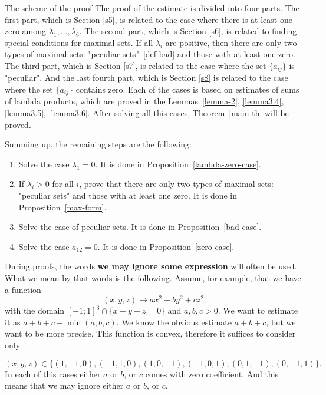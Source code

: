 \documentclass[12pt]{article}
\begin{document}
\begin{section}{The scheme of the proof}
The proof of the estimate is divided into four parts. The first part, which is Section \ref{s5}, is related to the case where there is at least one zero among $\lambda_{1},\ldots,\lambda_{6}.$ The second part, which is Section \ref{s6}, is related to finding special conditions for maximal sets. If all $\lambda_{i}$ are positive, then there are only two types of maximal sets: "peculiar sets"~\ref{def-bad} and those with at least one zero. The third part, which is Section \ref{s7}, is related to the case where the set $\{a_{ij}\}$ is "peculiar". And the last fourth part, which is Section \ref{s8} is related to the case where the set $\{a_{ij}\}$ contains zero. Each of the cases is based on estimates of sums of lambda products, which are proved in the Lemmas~\ref{lemma-2}, \ref{lemma3.4}, \ref{lemma3.5}, \ref{lemma3.6}. After solving all this cases, Theorem~\ref{main-th} will be proved. 

Summing up, the remaining steps are the following:

\begin{enumerate}
    \item Solve the case $\lambda_{1}=0.$ It is done in Proposition~\ref{lambda-zero-case}.
    \item If $\lambda_{i}>0$ for all $i$, prove that there are only two types of maximal sets: "peculiar sets" and those with at least one zero. It is done in Proposition~\ref{max-form}. 
    \item Solve the case of peculiar sets. It is done in Proposition~\ref{bad-case}.
    \item Solve the case  $a_{12}=0$. It is done in Proposition~\ref{zero-case}.
    
\end{enumerate}


    During proofs, the words \textbf{we may ignore some  expression} will often be used. What we mean by that words is the following. Assume, for example, that we have a function $$(x,y,z)\mapsto ax^2 + by^2 + cz^2$$ with the domain $[-1;1]^{3}\cap \{x+y+z=0\}$ and $a,b,c > 0$. We want to estimate it as $a+b+c - \min(a,b,c).$ We know the obvious estimate $a+b+c$, but we want to be more precise. This function is convex, therefore it suffices to consider only 
    
    $$(x,y,z)\in \{(1,-1,0),(-1,1,0),(1,0,-1),(-1,0,1),(0,1,-1), (0,-1,1)\}.$$  
    In each of this cases either $a$ or $b$, or $c$ comes with zero coefficient. And this means that we may ignore either $a$ or $b$, or $c$. 



\end{section}
\end{document}
